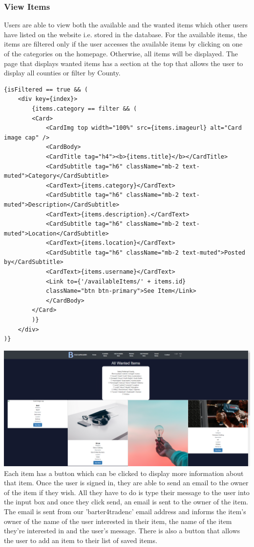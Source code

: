 \subsubsection{View Items}
Users are able to view both the available and the wanted items which other users have listed on the website i.e. stored in the database. For the available items, the items are filtered only if the user accesses the available items by clicking on one of the categories on the homepage. Otherwise, all items will be displayed. The page that displays wanted items has a section at the top that allows the user to display all counties or filter by County.
\begin{verbatim}
{isFiltered == true && (
    <div key={index}>
        {items.category == filter && (
        <Card>
            <CardImg top width="100%" src={items.imageurl} alt="Card image cap" />
            <CardBody>
            <CardTitle tag="h4"><b>{items.title}</b></CardTitle>
            <CardSubtitle tag="h6" className="mb-2 text-muted">Category</CardSubtitle>
            <CardText>{items.category}</CardText>
            <CardSubtitle tag="h6" className="mb-2 text-muted">Description</CardSubtitle>
            <CardText>{items.description}.</CardText>
            <CardSubtitle tag="h6" className="mb-2 text-muted">Location</CardSubtitle>
            <CardText>{items.location}</CardText>
            <CardSubtitle tag="h6" className="mb-2 text-muted">Posted by</CardSubtitle>
            <CardText>{items.username}</CardText>
            <Link to={'/availableItems/' + items.id}
            className="btn btn-primary">See Item</Link>
            </CardBody>
        </Card>
        )}
    </div>
)}
\end{verbatim}
\includegraphics[width=\textwidth]{img/fe_wanteditems.PNG}
\newline
Each item has a button which can be clicked to display more information about that item. Once the user is signed in, they are able to send an email to the owner of the item if they wish. All they have to do is type their message to the user into the input box and once they click send, an email is sent to the owner of the item. The email is sent from our 'barter4tradenc' email address and informs the item's owner of the name of the user interested in their item, the name of the item they're interested in and the user's message. There is also a button that allows the user to add an item to their list of saved items.
